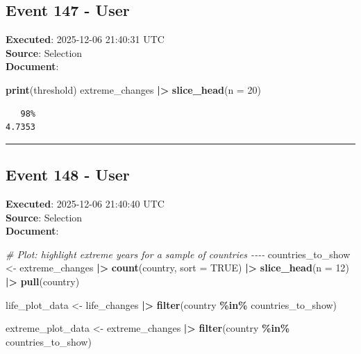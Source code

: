 \documentclass[
  11pt,
]{article}
\newenvironment{Shaded}{\begin{snugshade}}{\end{snugshade}}
\newcommand{\AttributeTok}[1]{\textcolor[rgb]{0.13,0.29,0.53}{#1}}
\newcommand{\CommentTok}[1]{\textcolor[rgb]{0.56,0.35,0.01}{\textit{#1}}}
\newcommand{\ConstantTok}[1]{\textcolor[rgb]{0.56,0.35,0.01}{#1}}
\newcommand{\DecValTok}[1]{\textcolor[rgb]{0.00,0.00,0.81}{#1}}
\newcommand{\FunctionTok}[1]{\textcolor[rgb]{0.13,0.29,0.53}{\textbf{#1}}}
\newcommand{\NormalTok}[1]{#1}
\newcommand{\OtherTok}[1]{\textcolor[rgb]{0.56,0.35,0.01}{#1}}
\newcommand{\SpecialCharTok}[1]{\textcolor[rgb]{0.81,0.36,0.00}{\textbf{#1}}}
\newenvironment{rpoutput}{\vspace{0.5em}\begin{snugshade}}{\end{snugshade}}
\begin{document}
\subsection{Event 147 - User}\label{event-147---user}

\textbf{Executed}: 2025-12-06 21:40:31 UTC\\
\textbf{Source}: Selection\\
\textbf{Document}:

\begin{Shaded}
\begin{Highlighting}[]
\FunctionTok{print}\NormalTok{(threshold)}
\NormalTok{extreme\_changes }\SpecialCharTok{|\textgreater{}} 
  \FunctionTok{slice\_head}\NormalTok{(}\AttributeTok{n =} \DecValTok{20}\NormalTok{)}
\end{Highlighting}
\end{Shaded}

\begin{rpoutput}

\begin{verbatim}
   98% 
4.7353 
\end{verbatim}

\end{rpoutput}

\begin{center}\rule{0.5\linewidth}{0.5pt}\end{center}

\subsection{Event 148 - User}\label{event-148---user}

\textbf{Executed}: 2025-12-06 21:40:40 UTC\\
\textbf{Source}: Selection\\
\textbf{Document}:

\begin{Shaded}
\begin{Highlighting}[]
\CommentTok{\# Plot: highlight extreme years for a sample of countries {-}{-}{-}{-}}
\NormalTok{countries\_to\_show }\OtherTok{\textless{}{-}}\NormalTok{ extreme\_changes }\SpecialCharTok{|\textgreater{}}
  \FunctionTok{count}\NormalTok{(country, }\AttributeTok{sort =} \ConstantTok{TRUE}\NormalTok{) }\SpecialCharTok{|\textgreater{}}
  \FunctionTok{slice\_head}\NormalTok{(}\AttributeTok{n =} \DecValTok{12}\NormalTok{) }\SpecialCharTok{|\textgreater{}}
  \FunctionTok{pull}\NormalTok{(country)}

\NormalTok{life\_plot\_data }\OtherTok{\textless{}{-}}\NormalTok{ life\_changes }\SpecialCharTok{|\textgreater{}}
  \FunctionTok{filter}\NormalTok{(country }\SpecialCharTok{\%in\%}\NormalTok{ countries\_to\_show)}

\NormalTok{extreme\_plot\_data }\OtherTok{\textless{}{-}}\NormalTok{ extreme\_changes }\SpecialCharTok{|\textgreater{}}
  \FunctionTok{filter}\NormalTok{(country }\SpecialCharTok{\%in\%}\NormalTok{ countries\_to\_show)}
\end{Highlighting}
\end{Shaded}
\end{document}

